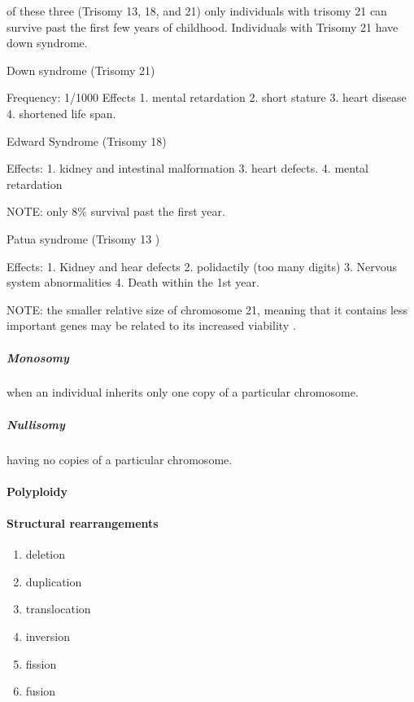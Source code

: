 \documentclass[]{article}
\providecommand{\tightlist}{%
  \setlength{\itemsep}{0pt}\setlength{\parskip}{0pt}}
\let\oldparagraph\paragraph
\renewcommand{\paragraph}[1]{\oldparagraph{#1}\mbox{}}
\let\oldsubparagraph\subparagraph
\renewcommand{\subparagraph}[1]{\oldsubparagraph{#1}\mbox{}}
\begin{document}
of these three (Trisomy 13, 18, and 21) only individuals with trisomy 21
can survive past the first few years of childhood. Individuals with
Trisomy 21 have down syndrome.

Down syndrome (Trisomy 21)

Frequency: 1/1000 Effects 1. mental retardation 2. short stature 3.
heart disease 4. shortened life span.

Edward Syndrome (Trisomy 18)

Effects: 1. kidney and intestinal malformation 3. heart defects. 4.
mental retardation

NOTE: only 8\% survival past the first year.

Patua syndrome (Trisomy 13 )

Effects: 1. Kidney and hear defects 2. polidactily (too many digits) 3.
Nervous system abnormalities 4. Death within the 1st year.

NOTE: the smaller relative size of chromosome 21, meaning that it
contains less important genes may be related to its increased viability
.

\hypertarget{monosomy-1}{%
\subparagraph{Monosomy}\label{monosomy-1}}

when an individual inherits only one copy of a particular chromosome.

\hypertarget{nullisomy-1}{%
\subparagraph{Nullisomy}\label{nullisomy-1}}

having no copies of a particular chromosome.

\hypertarget{polyploidy-2}{%
\paragraph{Polyploidy}\label{polyploidy-2}}

\hypertarget{structural-rearrangements-1}{%
\paragraph{Structural
rearrangements}\label{structural-rearrangements-1}}

\begin{enumerate}
\def\labelenumi{\arabic{enumi}.}
\tightlist
\item
  deletion
\item
  duplication
\item
  translocation
\item
  inversion
\item
  fission
\item
  fusion
\end{enumerate}
\end{document}
